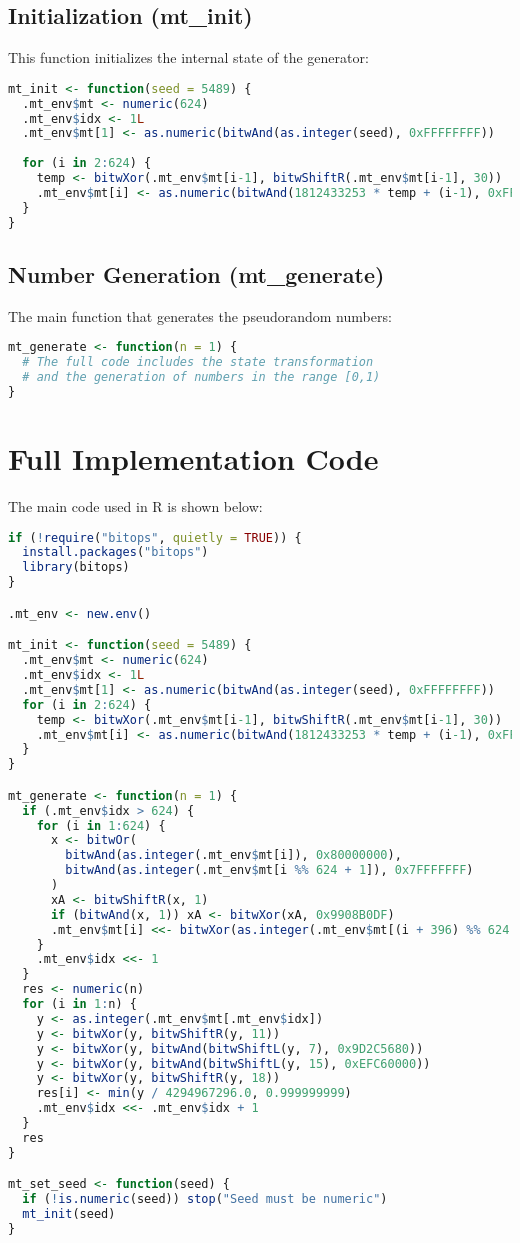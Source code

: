 \documentclass[12pt]{article}
\begin{document}
\subsection{Initialization (mt\_init)}
This function initializes the internal state of the generator:
\begin{lstlisting}[language=R]
mt_init <- function(seed = 5489) {
  .mt_env$mt <- numeric(624)
  .mt_env$idx <- 1L
  .mt_env$mt[1] <- as.numeric(bitwAnd(as.integer(seed), 0xFFFFFFFF))
  
  for (i in 2:624) {
    temp <- bitwXor(.mt_env$mt[i-1], bitwShiftR(.mt_env$mt[i-1], 30))
    .mt_env$mt[i] <- as.numeric(bitwAnd(1812433253 * temp + (i-1), 0xFFFFFFFF))
  }
}
\end{lstlisting}

\subsection{Number Generation (mt\_generate)}
The main function that generates the pseudorandom numbers:
\begin{lstlisting}[language=R]
mt_generate <- function(n = 1) {
  # The full code includes the state transformation
  # and the generation of numbers in the range [0,1)
}
\end{lstlisting}

\section{Full Implementation Code}
The main code used in R is shown below:
\begin{lstlisting}[language=R]
if (!require("bitops", quietly = TRUE)) {
  install.packages("bitops")
  library(bitops)
}

.mt_env <- new.env()

mt_init <- function(seed = 5489) {
  .mt_env$mt <- numeric(624)
  .mt_env$idx <- 1L
  .mt_env$mt[1] <- as.numeric(bitwAnd(as.integer(seed), 0xFFFFFFFF))
  for (i in 2:624) {
    temp <- bitwXor(.mt_env$mt[i-1], bitwShiftR(.mt_env$mt[i-1], 30))
    .mt_env$mt[i] <- as.numeric(bitwAnd(1812433253 * temp + (i-1), 0xFFFFFFFF))
  }
}

mt_generate <- function(n = 1) {
  if (.mt_env$idx > 624) {
    for (i in 1:624) {
      x <- bitwOr(
        bitwAnd(as.integer(.mt_env$mt[i]), 0x80000000),
        bitwAnd(as.integer(.mt_env$mt[i %% 624 + 1]), 0x7FFFFFFF)
      )
      xA <- bitwShiftR(x, 1)
      if (bitwAnd(x, 1)) xA <- bitwXor(xA, 0x9908B0DF)
      .mt_env$mt[i] <<- bitwXor(as.integer(.mt_env$mt[(i + 396) %% 624 + 1]), xA)
    }
    .mt_env$idx <<- 1
  }
  res <- numeric(n)
  for (i in 1:n) {
    y <- as.integer(.mt_env$mt[.mt_env$idx])
    y <- bitwXor(y, bitwShiftR(y, 11))
    y <- bitwXor(y, bitwAnd(bitwShiftL(y, 7), 0x9D2C5680))
    y <- bitwXor(y, bitwAnd(bitwShiftL(y, 15), 0xEFC60000))
    y <- bitwXor(y, bitwShiftR(y, 18))
    res[i] <- min(y / 4294967296.0, 0.999999999)
    .mt_env$idx <<- .mt_env$idx + 1
  }
  res
}

mt_set_seed <- function(seed) {
  if (!is.numeric(seed)) stop("Seed must be numeric")
  mt_init(seed)
}
\end{lstlisting}
\end{document}
